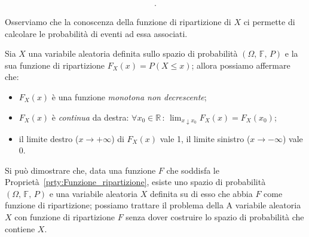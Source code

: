 \begin{obsv}
\begin{enumerate}[\indent (a)]
\begin{align*}
                    .\end{align*}
            \end{enumerate}
            Osserviamo che la conoscenza della funzione di ripartizione di $X$ ci permette di calcolare le probabilità di eventi ad essa associati.
            \begin{prty}\label{prty:Funzione_ripartizione}
                Sia $X$ una variabile aleatoria definita sullo spazio di probabilità $(\Omega,\,\mathbb{F},\,P)$ e la sua funzione di ripartizione $F_X(x) = P(X \leq x)$; allora possiamo affermare che:
                \begin{itemize}
                    \item $F_X(x)$ è una funzione \textit{monotona non decrescente};
                    \item $F_X(x)$ è \textit{continua} da destra: $\forall x_0 \in \mathbb{R} \,:\, \lim_{x \downarrow x_0} F_X(x) = F_X(x_0)$;
                    \item il limite destro ($x \rightarrow +\infty$) di $F_X(x)$ vale 1, il limite sinistro ($x \rightarrow -\infty$) vale 0.
                \end{itemize}
            \end{prty}
            \begin{obsv}
                Si può dimostrare che, data una funzione $F$ che soddisfa le Proprietà~\ref{prty:Funzione_ripartizione}, esiste uno spazio di probabilità $(\Omega,\,\mathbb{F},\,P)$ e una variabile aleatoria $X$ definita su di esso che abbia $F$ come funzione di ripartizione; possiamo trattare il problema della A variabile aleatoria $X$ con funzione di ripartizione $F$ senza dover costruire lo spazio di probabilità che contiene $X$.
            \end{obsv}
        \end{obsv}
